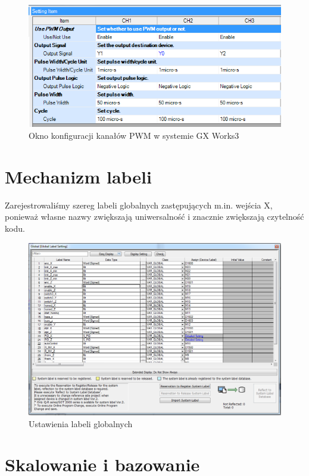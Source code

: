 \documentclass{mwrep}
\begin{document}
\begin{figure}[H]
    \label{PLC::Konfiguracja::HIOEN::WindowCH5}
    \centering
    \includegraphics[scale=0.5]{pwm.png}
    \caption{Okno konfiguracji kanałów PWM w systemie GX Works3}
\end{figure}

\section{Mechanizm labeli}
\label{PLC::Labels}

Zarejestrowaliśmy szereg labeli globalnych zastępujących m.in. wejścia X, ponieważ własne nazwy zwiększają uniwersalność i znacznie zwiększają czytelność kodu.

\begin{figure}[H]
    \label{PLC::Konfiguracja::HIOEN::WindowCH5}
    \centering
    \includegraphics[scale=0.5]{global_label.png}
    \caption{Ustawienia labeli globalnych}
\end{figure}

\section{Skalowanie i bazowanie}
\label{PLC::Bazowanie}
\end{document}
